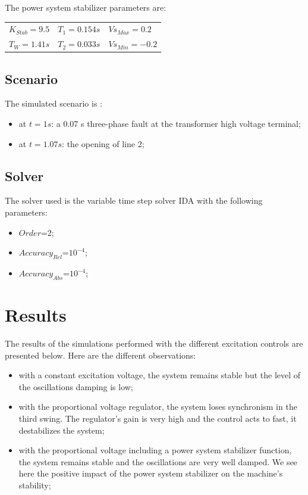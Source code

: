 \documentclass[a4paper, 12pt]{report}
\begin{document}
The power system stabilizer parameters are:
\begin{center}
\begin{tabular}{l|l|l}
   $K_{Stab}=9.5$ & $T_1=0.154s$ & $Vs_{Max}=0.2$  \\
   $T_W=1.41s$ & $T_2=0.033s$ & $Vs_{Min}=-0.2$   \\
\end{tabular}
\end{center}

\subsection{Scenario}
The simulated scenario is :
\begin{itemize}
\item at $t=1s$: a 0.07 s three-phase fault at the transformer high voltage terminal;
\item at $t=1.07s$: the opening of line 2;
\end{itemize}

\subsection{Solver}
The solver used is the variable time step solver IDA with the following parameters:
\begin{itemize}
\item $Order$=2;
\item $Accuracy_{Rel}$=$10^{-4}$;
\item $Accuracy_{Abs}$=$10^{-4}$;
\end{itemize}

\section{Results}

The results of the simulations performed with the different excitation controls are presented below. Here are the different observations:
\begin{itemize}
\item with a constant excitation voltage, the system remains stable but the level of the oscillations damping is low;
\item with the proportional voltage regulator, the system loses synchronism in the third swing. The regulator's gain is very high and the control acts to fast, it destabilizes the system;
\item with the proportional voltage including a power system stabilizer function, the system remains stable and the oscillations are very well damped. We see here the positive impact of the power system stabilizer on the machine's stability;
\end{itemize}
\end{document}
